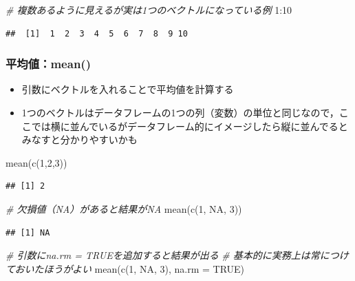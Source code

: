 \documentclass[
  xelatex,ja=standard, b5paper]{bxjsbook}
\newenvironment{Shaded}{\begin{snugshade}}{\end{snugshade}}
\newcommand{\AttributeTok}[1]{\textcolor[rgb]{0.77,0.63,0.00}{#1}}
\newcommand{\CommentTok}[1]{\textcolor[rgb]{0.56,0.35,0.01}{\textit{#1}}}
\newcommand{\ConstantTok}[1]{\textcolor[rgb]{0.00,0.00,0.00}{#1}}
\newcommand{\DecValTok}[1]{\textcolor[rgb]{0.00,0.00,0.81}{#1}}
\newcommand{\FunctionTok}[1]{\textcolor[rgb]{0.00,0.00,0.00}{#1}}
\newcommand{\NormalTok}[1]{#1}
\newcommand{\SpecialCharTok}[1]{\textcolor[rgb]{0.00,0.00,0.00}{#1}}
\providecommand{\tightlist}{%
  \setlength{\itemsep}{0pt}\setlength{\parskip}{0pt}}
\begin{document}
\begin{Shaded}
\begin{Highlighting}[]
\CommentTok{\# 複数あるように見えるが実は1つのベクトルになっている例}
\DecValTok{1}\SpecialCharTok{:}\DecValTok{10}
\end{Highlighting}
\end{Shaded}

\begin{verbatim}
##  [1]  1  2  3  4  5  6  7  8  9 10
\end{verbatim}

\hypertarget{p-function-ex-m}{%
\subsubsection{平均値：mean()}\label{p-function-ex-m}}

\begin{itemize}
\tightlist
\item
  引数にベクトルを入れることで平均値を計算する
\item
  1つのベクトルはデータフレームの1つの列（変数）の単位と同じなので，ここでは横に並んでいるがデータフレーム的にイメージしたら縦に並んでるとみなすと分かりやすいかも
\end{itemize}

\begin{Shaded}
\begin{Highlighting}[]
\FunctionTok{mean}\NormalTok{(}\FunctionTok{c}\NormalTok{(}\DecValTok{1}\NormalTok{,}\DecValTok{2}\NormalTok{,}\DecValTok{3}\NormalTok{))}
\end{Highlighting}
\end{Shaded}

\begin{verbatim}
## [1] 2
\end{verbatim}

\begin{Shaded}
\begin{Highlighting}[]
\CommentTok{\# 欠損値（NA）があると結果がNA}
\FunctionTok{mean}\NormalTok{(}\FunctionTok{c}\NormalTok{(}\DecValTok{1}\NormalTok{, }\ConstantTok{NA}\NormalTok{, }\DecValTok{3}\NormalTok{))}
\end{Highlighting}
\end{Shaded}

\begin{verbatim}
## [1] NA
\end{verbatim}

\begin{Shaded}
\begin{Highlighting}[]
\CommentTok{\# 引数にna.rm = TRUEを追加すると結果が出る}
\CommentTok{\# 基本的に実務上は常につけておいたほうがよい}
\FunctionTok{mean}\NormalTok{(}\FunctionTok{c}\NormalTok{(}\DecValTok{1}\NormalTok{, }\ConstantTok{NA}\NormalTok{, }\DecValTok{3}\NormalTok{), }\AttributeTok{na.rm =} \ConstantTok{TRUE}\NormalTok{)}
\end{Highlighting}
\end{Shaded}
\end{document}
